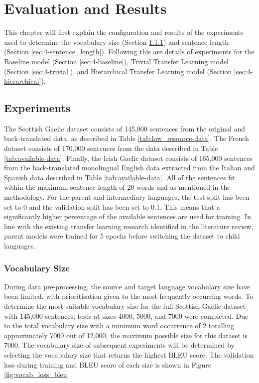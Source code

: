 \chapter{Evaluation and Results}
This chapter will first explain the configuration and results of the experiments used to determine the vocabulary size (Section \ref{sec:4-vocab_size}) and sentence length (Section \ref{sec:4-sentence_length}). Following this are details of experiments for the Baseline model (Section \ref{sec:4-baseline}), Trivial Transfer Learning model (Section \ref{sec:4-trivial}), and Hierarchical Transfer Learning model (Section \ref{sec:4-hierarchical}).
\newpage

\section{Experiments}

The Scottish Gaelic dataset consists of 145,000 sentences from the original and back-translated data, as described in Table \ref{tab:low_resource-data}. The French dataset consists of 170,000 sentences from the data described in Table \ref{tab:available-data}. Finally, the Irish Gaelic dataset consists of 165,000 sentences from the back-translated monolingual English data extracted from the Italian and Spanish data described in Table \ref{tab:available-data}.
All of the sentences fit within the maximum sentence length of 20 words and as mentioned in the methodology.
For the parent and intermediary languages, the test split has been set to 0 and the validation split has been set to 0.1. This means that a significantly higher percentage of the available sentences are used for training. In line with the existing transfer learning research identified in the literature review, parent models were trained for 5 epochs before switching the dataset to child languages.


\subsection{Vocabulary Size}
\label{sec:4-vocab_size}

During data pre-processing, the source and target language vocabulary size have been limited, with prioritisation given to the most frequently occurring words. To determine the most suitable vocabulary size for the full Scottish Gaelic dataset with 145,000 sentences, tests at sizes 4000, 5000, and 7000 were completed. Due to the total vocabulary size with a minimum word occurrence of 2 totalling approximately 7000 out of 12,000, the maximum possible size for this dataset is 7000. 
The vocabulary size of subsequent experiments will be determined by selecting the vocabulary size that returns the highest \acrshort{BLEU} score. The validation loss during training and \acrshort{BLEU} score of each size is shown in Figure \ref{fig:vocab_loss_bleu}.

